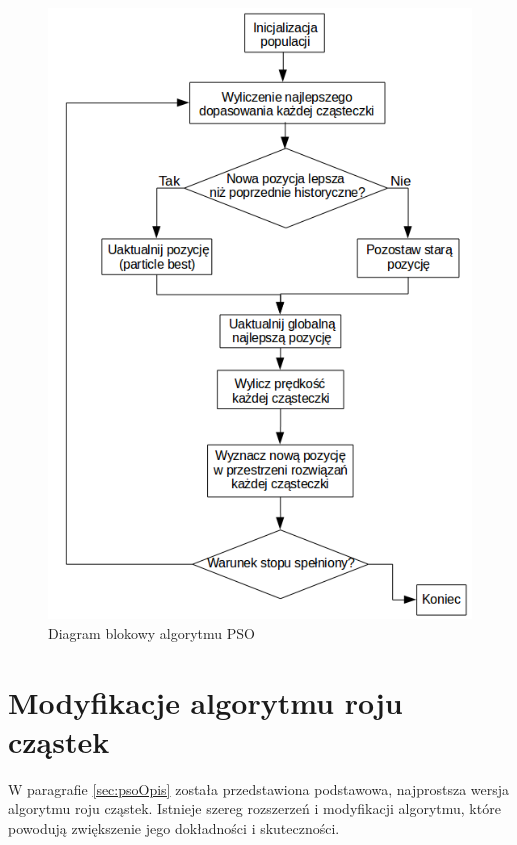 \begin{figure}[H]
\begin{center} 
\includegraphics[scale=0.55]{tresc/pics/psoDiagram.png}
\caption{Diagram blokowy algorytmu PSO}
\label{fig:psoDiagram}
\end{center}
\end{figure}


\section{Modyfikacje algorytmu roju cząstek}
\label{sec:psoModyfikacje}
W paragrafie \ref{sec:psoOpis} została przedstawiona podstawowa, najprostsza wersja algorytmu roju cząstek. Istnieje szereg rozszerzeń i modyfikacji algorytmu, które powodują zwiększenie jego dokładności i skuteczności.



